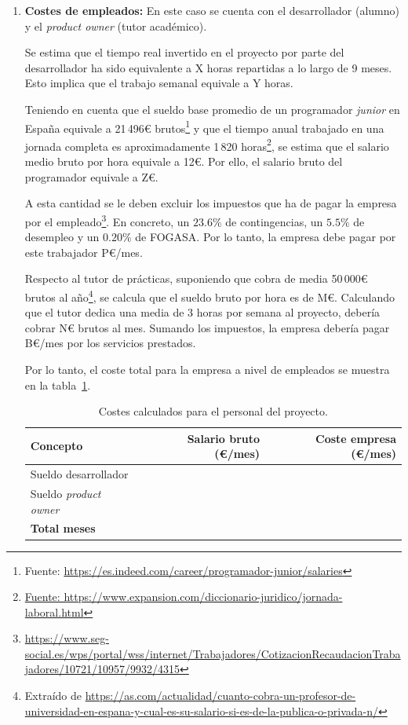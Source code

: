 \begin{enumerate}
	\item\textbf{Costes de empleados:} En este caso se cuenta con el desarrollador (alumno) y el \textit{product owner} (tutor académico).

Se estima que el tiempo real invertido en el proyecto por parte del desarrollador ha sido equivalente a X horas repartidas a lo largo de 9 meses. Esto implica que el trabajo semanal equivale a Y horas.

Teniendo en cuenta que el sueldo base promedio de un programador \textit{junior} en España equivale a 21\,496€ brutos\footnote{Fuente: \url{https://es.indeed.com/career/programador-junior/salaries}} y que el tiempo anual trabajado en una jornada completa es aproximadamente 1\,820 horas\footnote{\url{Fuente: https://www.expansion.com/diccionario-juridico/jornada-laboral.html}}, se estima que el salario medio bruto por hora equivale a 12€. Por ello, el salario bruto del programador equivale a Z€.

A esta cantidad se le deben excluir los impuestos que ha de pagar la empresa por el empleado\footnote{\url{https://www.seg-social.es/wps/portal/wss/internet/Trabajadores/CotizacionRecaudacionTrabajadores/10721/10957/9932/4315}}. En concreto, un $23$.$6\%$ de contingencias, un $5$.$5\%$ de desempleo y un $0$.$20\%$ de FOGASA. Por lo tanto, la empresa debe pagar por este trabajador P€/mes.

Respecto al tutor de prácticas, suponiendo que cobra de media 50\,000€ brutos al año\footnote{Extraído de \url{https://as.com/actualidad/cuanto-cobra-un-profesor-de-universidad-en-espana-y-cual-es-su-salario-si-es-de-la-publica-o-privada-n/}}, se calcula que el sueldo bruto por hora es de M€. Calculando que el tutor dedica una media de 3 horas por semana al proyecto, debería cobrar N€ brutos al mes. Sumando los impuestos, la empresa debería pagar B€/mes por los servicios prestados.

Por lo tanto, el coste total para la empresa a nivel de empleados se muestra en la tabla~\ref{a:costes-personal}.

\begin{table}[p]
	\centering
	\begin{tabular}{l r r}
		\toprule
		\textbf{Concepto} & \textbf{Salario bruto (€/mes)} & \textbf{Coste empresa (€/mes)} \\
		\midrule
		Sueldo desarrollador &  & \\
		Sueldo \textit{product owner} & & \\
		\midrule
		\textbf{Total meses} & & \\
		\bottomrule
	\end{tabular}
	\caption[Costes: empleados]{Costes calculados para el personal del proyecto.}
	\label{a:costes-personal}
\end{table}



\end{enumerate}
